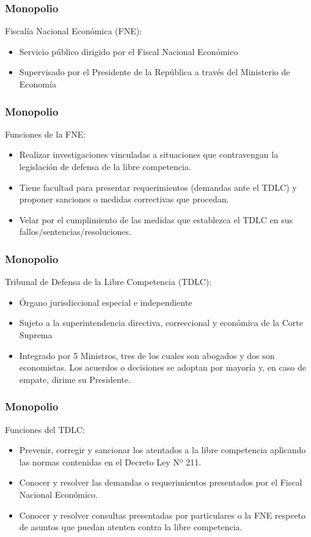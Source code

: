 \documentclass[dvipsnames,table,leqno]{beamer}
\begin{document}
		\begin{frame}
			\frametitle{Monopolio}
			Fiscalía Nacional Económica (FNE):
			\begin{itemize}
				\item Servicio público dirigido por el Fiscal Nacional Económico
				\item Supervisado por el Presidente de la República a través del Ministerio de Economía
			\end{itemize}
		\end{frame}	

		\begin{frame}
			\frametitle{Monopolio}
			Funciones de la FNE:
			\begin{itemize}
				\item Realizar investigaciones vinculadas a situaciones que contravengan la legislación de defensa de la libre competencia.
				\item Tiene facultad para presentar requerimientos (demandas ante el TDLC) y proponer sanciones o medidas correctivas que procedan.
				\item Velar por el cumplimiento de las medidas que establezca el TDLC en sus fallos/sentencias/resoluciones.
			\end{itemize}
		\end{frame}	

		\begin{frame}
			\frametitle{Monopolio}
			Tribunal de Defensa de la Libre Competencia (TDLC):
			\begin{itemize}
				\item Órgano jurisdiccional especial e independiente
				\item Sujeto a la superintendencia directiva, correccional y económica de la Corte Suprema
				\item Integrado por 5 Ministros, tres de los cuales son abogados y dos son economistas.  Los acuerdos o decisiones se adoptan por mayoría y, en caso de empate, dirime su Presidente.
			\end{itemize}
		\end{frame}	

		\begin{frame}
			\frametitle{Monopolio}
			Funciones del TDLC:
			\begin{itemize}
				\item Prevenir, corregir y sancionar los atentados a la libre competencia aplicando las normas contenidas en el Decreto Ley Nº 211.
				\item Conocer y resolver las demandas o requerimientos presentados por el Fiscal Nacional Económico.
				\item Conocer y resolver consultas presentadas por particulares o la FNE respceto de asuntos que puedan atenten contra la libre competencia.
			\end{itemize}
		\end{frame}	
\end{document}
